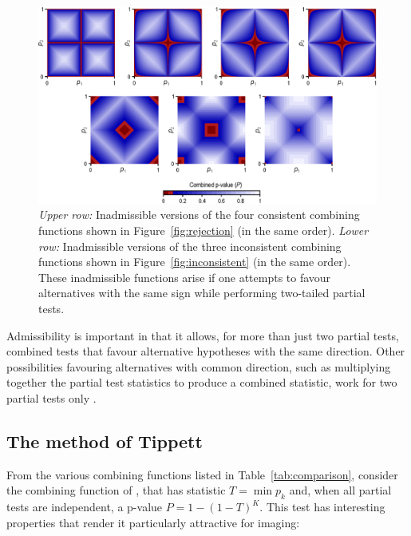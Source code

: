 \begin{figure}[!p]
\begin{center}
\centerline{\includegraphics[scale=.8]{images/inadmissible.eps}}
\end{center}
\caption[Examples of inadmissible combining functions.]{\emph{Upper row:} Inadmissible versions of the four consistent combining functions shown in Figure~\ref{fig:rejection} (in the same order). \emph{Lower row:} Inadmissible versions of the three inconsistent combining functions shown in Figure~\ref{fig:inconsistent} (in the same order). These inadmissible functions arise if one attempts to favour alternatives with the same sign while performing two-tailed partial tests.}
\label{fig:inadmissible}
\end{figure}

Admissibility is important in that it allows, for more than just two partial tests, combined tests that favour alternative hypotheses with the same direction. Other possibilities favouring alternatives with common direction, such as multiplying together the partial test statistics to produce a combined statistic, work for two partial tests only \citep{Hayasaka2006}.


\subsection{The method of Tippett}

From the various combining functions listed in Table~\ref{tab:comparison}, consider the combining function of \citet{Tippett1931}, that has statistic $T = \min {p_{k}}$ and, when all partial tests are independent, a p-value $P = 1-(1-T)^K$. This test has interesting properties that render it particularly attractive for imaging:

